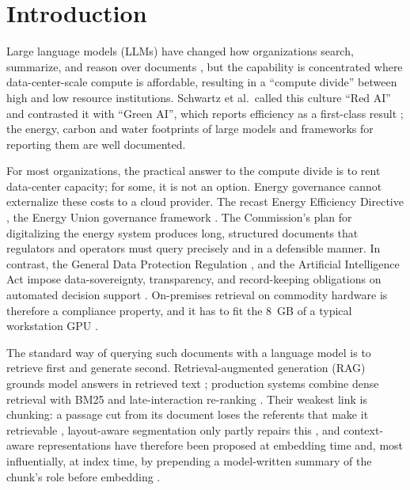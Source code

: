 \documentclass[pdflatex,sn-mathphys-num]{sn-jnl}
\theoremstyle{thmstyleone}%
\theoremstyle{thmstylethree}%
\begin{document}
\section{Introduction}\label{sec:intro}

Large language models (LLMs) have changed how organizations search, summarize, and reason over documents \cite{bengioetal2003,zhu2025informationretrieval}, but the capability is concentrated where data-center-scale compute is affordable, resulting in a  ``compute divide'' \cite{besiroglu2024computedividemachinelearning,sevilla2022compute,thompson2020computational,hooker2021hardware} between high and low resource institutions. Schwartz et al.\ called this culture ``Red AI'' and contrasted it with ``Green AI'', which reports efficiency as a first-class result \cite{schwartz2020green}; the energy, carbon and water footprints of large models \cite{strubell2019energycost,patterson2021carbon,Luccioni_2024,li2025makingaithirstyuncovering,devries2023growing,wu2022sustainable} and frameworks for reporting them \cite{henderson2020systematic,lacoste2019quantifyingcarbonemissionsmachine,lannelongue2021green,tabbakh2024GreenAI} are well documented.

For most organizations, the practical answer to the compute divide is to rent data-center capacity; for some, it is not an option. Energy governance cannot externalize these costs to a cloud provider. The recast Energy Efficiency Directive \cite{eueed2023}, the Energy Union governance framework \cite{eugovernance2018}. The Commission's plan for digitalizing the energy system \cite{eu2022digitalising} produces long, structured documents that regulators and operators must query precisely and in a defensible manner. In contrast, the General Data Protection Regulation \cite{gdpr2016}, and the Artificial Intelligence Act \cite{euaiact2024} impose data-sovereignty, transparency, and record-keeping obligations on automated decision support \cite{jorgensen2025aidecisionsupport}. On-premises retrieval on commodity hardware is therefore a compliance property, and it has to fit the 8\, GB of a typical workstation GPU \cite{zhou2019edge}.

The standard way of querying such documents with a language model is to retrieve first and generate second. Retrieval-augmented generation (RAG) grounds model answers in retrieved text \cite{lewisetal2021,info16090766,ram2023incontext}; production systems combine dense retrieval \cite{karpukhin2020dpr} with BM25 \cite{robertson1995okapi,robertson2009bm25} and late-interaction re-ranking \cite{khattab2020colbert,santhanam2022colbertv2,kiran2025hybrid,wang2024searching}. Their weakest link is chunking: a passage cut from its document loses the referents that make it retrievable \cite{merola2025reconstructingcontextevaluatingadvanced,smith2024evaluating,qu2024semanticchunkingworthcomputational,chen2023densex}, layout-aware segmentation only partly repairs this \cite{auer2024doclingtechnicalreport,verma2025s2chunkinghybridframework}, and context-aware representations have therefore been proposed at embedding time \cite{gunther2024latechunking} and, most influentially, at index time, by prepending a model-written summary of the chunk's role before embedding \cite{anthropic2024contextual}.
\end{document}
